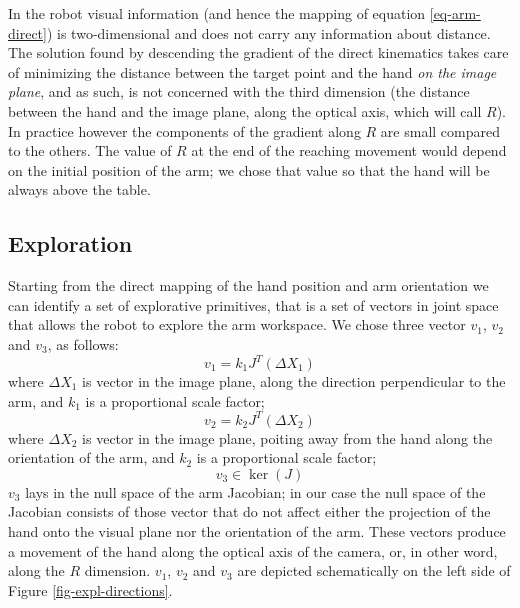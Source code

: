 In the robot visual information (and hence the mapping of equation 
\ref{eq-arm-direct}) is two-dimensional and does not carry any information
about distance. The solution found by descending the gradient of the 
direct kinematics takes care of minimizing the distance between the target 
point and the hand \emph{on the image plane}, and as such, is not concerned 
with the third dimension (the distance between the hand and the image 
plane, along the optical axis, which will call $R$). 
In practice however the components of the gradient along $R$ are small 
compared to the others. The value of $R$ at the end of the reaching movement 
would depend on the initial position of the arm; we chose that value so that
the hand will be always above the table.

\subsection{Exploration}
Starting from the direct mapping of the hand position and arm orientation we 
can identify a set of explorative primitives, that is a set of vectors in 
joint space that allows the robot to explore the arm workspace. We chose three 
vector $v_1$, $v_2$ and $v_3$, as follows:
\begin{equation}
  v_1=k_1J^T\left(\Delta X_1\right)
\end{equation}
where $\Delta X_1$ is vector in the image plane, along the direction 
perpendicular to the arm, and $k_1$ is a proportional scale factor;
\begin{equation}
  v_2=k_2J^T\left(\Delta X_2\right)
\end{equation}
where $\Delta X_2$ is vector in the image plane, poiting away from the hand 
along the orientation of the arm, and $k_2$ is a proportional scale factor;
\begin{equation}
 v_3\in \ker \left(J\right)
\end{equation}
$v_3$ lays in the null space of the arm Jacobian; in our case the 
null space of the Jacobian consists of those vector that do not affect 
either the projection of the hand onto the visual plane nor the orientation 
of the arm. These vectors produce a movement of the hand along the optical 
axis of the camera, or, in other word, along the $R$ dimension.
$v_1$, $v_2$ and $v_3$ are depicted schematically on the left side of 
Figure \ref{fig-expl-directions}.

